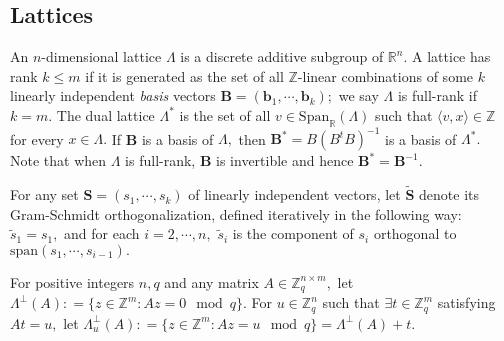 \documentclass[11pt]{article}
\newcommand{\Z}{\mathbb{Z}}
\begin{document}
\subsection{Lattices}\label{subsec:lattice}
An $n$-dimensional lattice $\Lambda$ is a discrete additive subgroup of
$\mathbb R^n.$ A lattice has rank $k\leq m$ if it is generated as the set of all $\Z$-linear combinations of some $k$ linearly independent \textit{basis} vectors $\textbf{B} = (\textbf{b}_1, \cdots, \textbf{b}_k);$ we say $\Lambda$ is full-rank if $k=m.$ The dual lattice $\Lambda^*$ is the set of all $v \in \text{Span}_{\mathbb R}(\Lambda)$ such that $\langle v, x \rangle \in \Z$ for every $x\in \Lambda.$ If \textbf{B} is a basis of $\Lambda,$ then $\textbf{B}^*=B(B^t B)^{-1}$ is a basis of $\Lambda^*.$ Note that when
$\Lambda$ is full-rank, \textbf{B} is invertible and hence $\textbf{B}^*=\textbf{B}^{-1}.$

For any set $\textbf{S}=(s_1, \cdots, s_k)$ of linearly independent vectors, let $\tilde{\textbf{S}}$ denote its Gram-Schmidt orthogonalization, defined iteratively in the following way: $\tilde{s}_1 = s_1 ,$ and for each $i=2, \cdots, n,$ $\tilde{s}_i$ is the component of $s_i$ orthogonal to $\text{span}(s_1,\cdots, s_{i-1}).$

For positive integers $n,q$ and any matrix $A \in \Z_q^{n\times m},$ let $\Lambda^{\perp}(A): = \{z \in \Z^m: Az = 0\mod q \} .$ For $u\in \Z_q^n$ such that $\exists t \in \Z_q^m$ satisfying $A t = u,$ let $\Lambda^{\perp}_u(A) : = \{ z\in \Z^m: Az = u \mod q\} = \Lambda^{\perp}(A) +t. $
\end{document}
